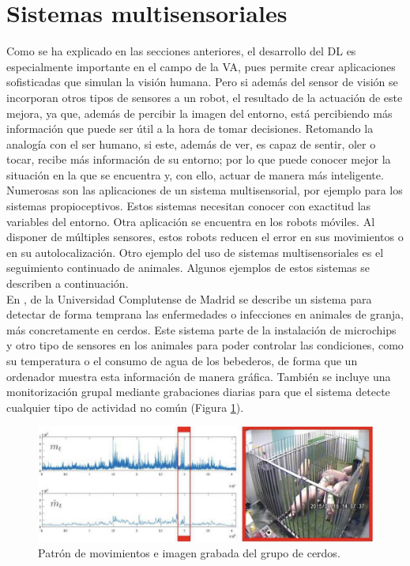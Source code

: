 \section{Sistemas multisensoriales}
Como se ha explicado en las secciones anteriores, el desarrollo del DL es especialmente importante en el campo de la VA, pues permite crear aplicaciones sofisticadas que simulan la visión humana. Pero si además del sensor de visión se incorporan otros tipos de sensores a un robot, el resultado de la actuación de este mejora, ya que, además de percibir la imagen del entorno, está percibiendo más información que puede ser útil a la hora de tomar decisiones. Retomando la analogía con el ser humano, si este, además de ver, es capaz de sentir, oler o tocar, recibe más información de su entorno; por lo que puede conocer mejor la situación en la que se encuentra y, con ello, actuar de manera más inteligente.\\

Numerosas son las aplicaciones de un sistema multisensorial, por ejemplo para los sistemas propioceptivos. Estos sistemas necesitan conocer con exactitud las variables del entorno. Otra aplicación se encuentra en los robots móviles. Al disponer de múltiples sensores, estos robots reducen el error en sus movimientos o en su autolocalización. Otro ejemplo del uso de sistemas multisensoriales es el seguimiento continuado de animales. Algunos ejemplos de estos sistemas se describen a continuación.\\

En \cite{ucm}, de la Universidad Complutense de Madrid se describe un sistema para detectar de forma temprana las enfermedades o infecciones en animales de granja, más concretamente en cerdos. Este sistema parte de la instalación de microchips y otro tipo de sensores en los animales para poder controlar las condiciones, como su temperatura o el consumo de agua de los bebederos, de forma que un ordenador muestra esta información de manera gráfica. También se incluye una monitorización grupal mediante grabaciones diarias para que el sistema detecte cualquier tipo de actividad no común (Figura \ref{fig:ucm}).\\
\begin{figure} [h!]
  \begin{center}
    \includegraphics[width=14cm]{figs/ucm}
  \end{center}
  \caption{Patrón de movimientos e imagen grabada del grupo de cerdos.}
  \label{fig:ucm}
\end{figure}

